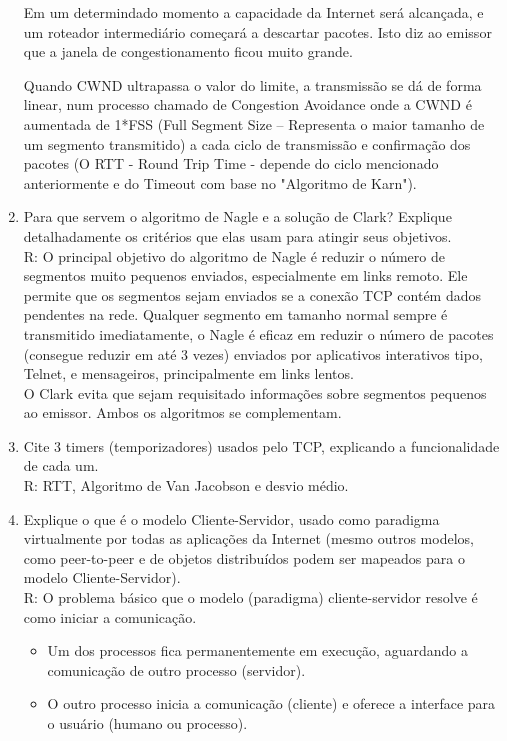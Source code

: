 \documentclass{article}
\begin{document}
\begin{enumerate}
	Em um determindado momento a capacidade da Internet será alcançada, e um
	roteador intermediário começará a descartar pacotes. Isto diz ao emissor que
	a janela de congestionamento ficou muito grande.

	Quando CWND ultrapassa o valor do limite, a transmissão se dá de forma
	linear, num processo chamado de Congestion Avoidance onde a CWND é aumentada
	de 1*FSS (Full Segment Size – Representa o maior tamanho de um segmento
	transmitido) a cada ciclo de transmissão e confirmação dos pacotes (O RTT -
	Round Trip Time - depende do ciclo mencionado anteriormente e do Timeout com
	base no "Algoritmo de Karn").
	
	\item Para que servem o algoritmo de Nagle e a solução de Clark? Explique detalhadamente os critérios que elas usam para atingir seus objetivos.
   \\R: O principal objetivo do algoritmo de Nagle é reduzir o número de segmentos muito pequenos enviados, especialmente em links remoto. Ele permite que os segmentos sejam enviados se a conexão TCP contém dados pendentes na rede. Qualquer segmento em tamanho normal sempre é transmitido imediatamente, o Nagle é eficaz em reduzir o número de pacotes (consegue reduzir em até 3 vezes) enviados por aplicativos interativos tipo, Telnet, e mensageiros, principalmente em links lentos.
   \\O Clark evita que sejam requisitado informações sobre segmentos pequenos ao emissor. Ambos os algoritmos se complementam.
	
	\item Cite 3 timers (temporizadores) usados pelo TCP, explicando a funcionalidade de cada um.
	\\R: RTT, Algoritmo de Van Jacobson e desvio médio.
	
	\item Explique o que é o modelo Cliente-Servidor, usado como paradigma virtualmente por todas as aplicações da Internet (mesmo outros modelos, como peer-to-peer e de objetos distribuídos podem ser mapeados para o modelo Cliente-Servidor).
	\\
	R: 
	O problema básico que o modelo (paradigma) cliente-servidor resolve é como iniciar a
comunicação.

\begin{itemize}
	\item Um dos processos fica permanentemente em execução, aguardando a comunicação
de outro processo (servidor).
	\item O outro processo inicia a comunicação (cliente) e oferece a interface para o usuário
(humano ou processo).
\end{itemize}


\end{enumerate}
\end{document}
